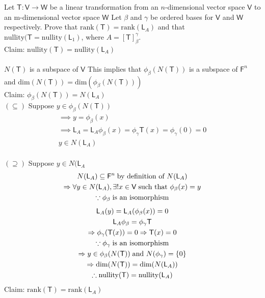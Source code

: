 Let $\mathsf{T}\colon\mathsf{V}\to\mathsf{W}$ be a linear
transformation from an $n$-dimensional vector space $\mathsf{V}$ to an
m-dimensional vector space $\mathsf{W}$  Let $\beta$ and $\gamma$ be
ordered bases for $\mathsf{V}$ and $\mathsf{W}$ respectively. Prove
that $\text{rank}(\mathsf{T}) = \text{rank}(\mathsf{L}_A)$ and that
$\text{nullity}(\mathsf{T} = \text{nullity}(\mathsf{L}_1)$, where $A = [\mathsf{T}]^\gamma_\beta$.
\\Claim: $\text{nullity}(\mathsf{T}) = \text{nullity}(\mathsf{L}_A)$
\paragraph{}$N(\mathsf{T})$ is a subspace of $\mathsf{V}$ This implies
that $\phi_\beta(N(\mathsf{T}))$ is a subspace of $\mathsf{F}^n$ and
$\text{dim}(N(\mathsf{T})) = \text{dim}(\phi_\beta(N(\mathsf{T})))$
\\Claim: $\phi_\beta(N(\mathsf{T})) = N(\mathsf{L}_A)$
\\$(\subseteq)$ Suppose $y \in \phi_\beta(N(\mathsf{T}))$
\begin{gather}
\implies y = \phi_\beta(x)\\
\implies \mathsf{L}_A = \mathsf{L}_A\phi_\beta(x) =
\phi_\gamma\mathsf{T}(x) = \phi_\gamma(0) =0 \\
y \in N(\mathsf{L}_A)
\end{gather}
\\$(\supseteq)$ Suppose $y \in N(\mathsf{L}_A$
\begin{gather}
N(\mathsf{L}_A) \subseteq \mathsf{F}^n\;\text{by definition of }
N(\mathsf{L}_A)\\
\implies \forall y \in N(\mathsf{L}_A), \exists ! x\in \mathsf{V}
\;\text{such that } \phi_\beta(x) = y\\
\notag \because \phi_\beta\; \text{is an isomorphism}
\end{gather}
\begin{gather}
\mathsf{L}_A(y) = \mathsf{L}_A(\phi_\beta(x)) =0 \\
\mathsf{L}_A\phi_\beta = \phi_\gamma\mathsf{T}\\
\implies \phi_\gamma(\mathsf{T}(x)) = 0
\implies \mathsf{T}(x) =0 \\
\notag \because \phi_\gamma\; \text{is an isomorphism}\\
\implies y \in \phi_\beta(N(\mathsf{T}))\;\text{and } N(\phi_\gamma) =
\{0\}\\
\implies \text{dim}(N(\mathsf{T})) = \text{dim}(N(\mathsf{L}_A))\\
\therefore \text{nullity}(\mathsf{T}) = \text{nullity}(\mathsf{L}_A)
\end{gather}
Claim: $\text{rank}(\mathsf{T}) = \text{rank}(\mathsf{L}_A)$
